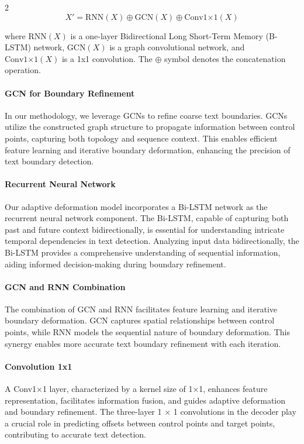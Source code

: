 \documentclass[sn-mathphys,Numbered]{sn-jnl}%
\begin{document}
\begin{multicols}{2}
\begin{equation}
    X' = \text{{RNN}}(X) \oplus \text{{GCN}}(X) \oplus \text{{Conv1×1}}(X)
\end{equation}

where $\text{{RNN}}(X)$ is a one-layer Bidirectional Long Short-Term Memory (B-LSTM) network, $\text{{GCN}}(X)$ is a graph convolutional network, and $\text{{Conv1×1}}(X)$ is a 1x1 convolution. The $\oplus$ symbol denotes the concatenation operation.

\paragraph{GCN for Boundary Refinement}

In our methodology, we leverage GCNs to refine coarse text boundaries. GCNs utilize the constructed graph structure to propagate information between control points, capturing both topology and sequence context. This enables efficient feature learning and iterative boundary deformation, enhancing the precision of text boundary detection.

\paragraph{Recurrent Neural Network}
Our adaptive deformation model incorporates a Bi-LSTM network as the recurrent neural network component. The Bi-LSTM, capable of capturing both past and future context bidirectionally, is essential for understanding intricate temporal dependencies in text detection. Analyzing input data bidirectionally, the Bi-LSTM provides a comprehensive understanding of sequential information, aiding informed decision-making during boundary refinement.

\paragraph{GCN and RNN Combination}
The combination of GCN and RNN facilitates feature learning and iterative boundary deformation. GCN captures spatial relationships between control points, while RNN models the sequential nature of boundary deformation. This synergy enables more accurate text boundary refinement with each iteration.

\paragraph{Convolution 1x1}
A Conv1×1 layer, characterized by a kernel size of 1×1, enhances feature representation, facilitates information fusion, and guides adaptive deformation and boundary refinement. The three-layer 1 × 1 convolutions in the decoder play a crucial role in predicting offsets between control points and target points, contributing to accurate text detection.


\end{multicols}
\end{document}
